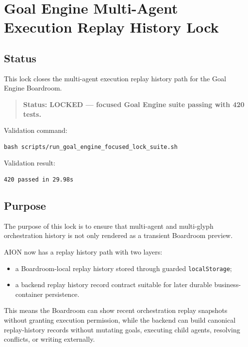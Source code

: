 \section{Goal Engine Multi-Agent Execution Replay History Lock}
\label{sec:goal-engine-multi-agent-execution-replay-history-lock}

\subsection{Status}

This lock closes the multi-agent execution replay history path for the Goal Engine Boardroom.

\begin{quote}
\textbf{Status: LOCKED --- focused Goal Engine suite passing with 420 tests.}
\end{quote}

Validation command:

\begin{verbatim}
bash scripts/run_goal_engine_focused_lock_suite.sh
\end{verbatim}

Validation result:

\begin{verbatim}
420 passed in 29.98s
\end{verbatim}

\subsection{Purpose}

The purpose of this lock is to ensure that multi-agent and multi-glyph orchestration history is not only rendered as a transient Boardroom preview.

AION now has a replay history path with two layers:

\begin{itemize}
  \item a Boardroom-local replay history stored through guarded \texttt{localStorage};
  \item a backend replay history record contract suitable for later durable business-container persistence.
\end{itemize}

This means the Boardroom can show recent orchestration replay snapshots without granting execution permission, while the backend can build canonical replay-history records without mutating goals, executing child agents, resolving conflicts, or writing externally.

